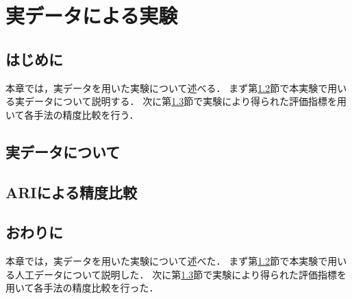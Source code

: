 \documentclass[a4j,12pt,dvipdfmx,oneside]{jsbook}
\theoremstyle{definition}
\begin{document}
\chapter{実データによる実験}\label{chap:real_data}
%
\section{はじめに}\label{sec:real_data_intro}
本章では，実データを用いた実験について述べる．
まず第\ref{sec:about_real_data}節で本実験で用いる実データについて説明する．
次に第\ref{sec:ari_compare}節で実験により得られた評価指標を用いて各手法の精度比較を行う．
%
\section{実データについて}\label{sec:about_real_data}
%
\section{ARIによる精度比較}\label{sec:ari_compare}
%
\section{おわりに}\label{sec:real_data_summary}
本章では，実データを用いた実験について述べた．
まず第\ref{sec:about_real_data}節で本実験で用いる人工データについて説明した．
次に第\ref{sec:ari_compare}節で実験により得られた評価指標を用いて各手法の精度比較を行った．
%
%
%
%
\end{document}
